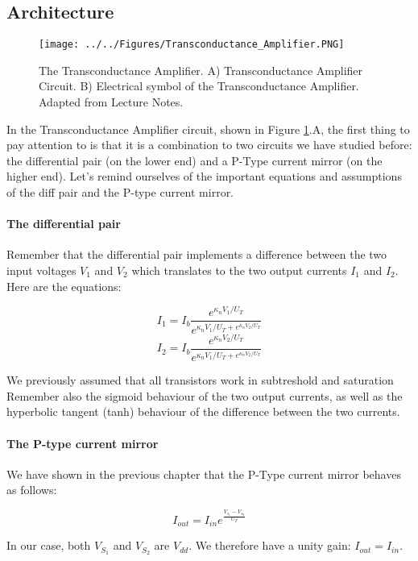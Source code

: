 \subsection{Architecture}
\begin{figure}[H]
    \centering
    \texttt{[image: ../../Figures/Transconductance\_Amplifier.PNG]}
    \caption{The Transconductance Amplifier. A) Transconductance Amplifier Circuit. B) Electrical symbol of the Transconductance Amplifier. Adapted from Lecture Notes.}
    \label{fig:transconductance_amplifier}
\end{figure}

In the Transconductance Amplifier circuit, shown in Figure \ref{fig:transconductance_amplifier}.A, the first thing to pay attention to is that it is a combination to two circuits we have studied before: the differential pair (on the lower end) and a P-Type current mirror (on the higher end). Let's remind ourselves of the important equations and assumptions of the diff pair and the P-type current mirror. 
\newline
\paragraph{The differential pair} Remember that the differential pair implements a difference between the two input voltages $V_1$ and $V_2$ which translates to the two output currents $I_1$ and $I_2$. Here are the equations:

\begin{equation}
    I_1 = I_b\frac{e^{\kappa_n V_1/U_T}}{e^{\kappa_n V_1/U_T + e^{\kappa_n V_2/U_T}}}
\end{equation}
\begin{equation}
    I_2 = I_b\frac{e^{\kappa_n V_2/U_T}}{e^{\kappa_n V_1/U_T + e^{\kappa_n V_2/U_T}}}
\end{equation}

We previously assumed that all transistors work in subtreshold and saturation Remember also the sigmoid behaviour of the two output currents, as well as the hyperbolic tangent (tanh) behaviour of the difference between the two currents. 

\paragraph{The P-type current mirror}

We have shown in the previous chapter that the P-Type current mirror behaves as follows: 

\begin{equation}
I_{out} = I_{in} e^{\frac{V_{s_1} - V_{s_2}}{U_T}}
\end{equation}

In our case, both $V_{S_1}$ and $V_{S_2}$ are $V_{dd}$. We therefore have a unity gain: $I_{out} = I_{in}$. 

